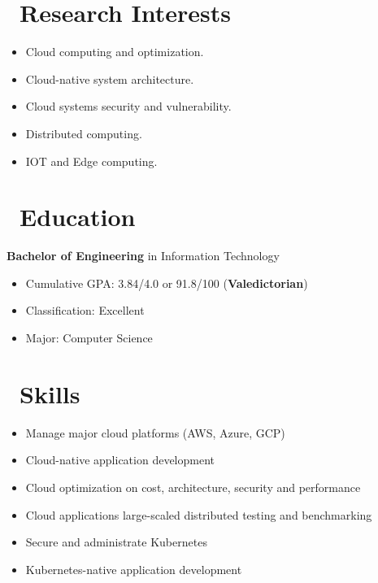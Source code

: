 \documentclass{resume}
\begin{document}




\section{\faBullseye\ Research Interests}
\begin{itemize}[parsep=0.5ex]
  \item Cloud computing and optimization.
  \item Cloud-native system architecture.
  \item Cloud systems security and vulnerability.
  \item Distributed computing.
  \item IOT and Edge computing.
\end{itemize}

\section{\faGraduationCap\ Education}
\textbf{Bachelor of Engineering} in Information Technology
\begin{itemize}[parsep=0.5ex]
  \item Cumulative GPA: 3.84/4.0 or 91.8/100 (\textbf{Valedictorian})
  \item Classification: Excellent
  \item Major: Computer Science
\end{itemize}


\section{\faCogs\ Skills}
\begin{itemize}[parsep=0.5ex]
  \item Manage major cloud platforms (AWS, Azure, GCP)
  \item Cloud-native application development
  \item Cloud optimization on cost, architecture, security and performance
  \item Cloud applications large-scaled distributed testing and benchmarking
  \item Secure and administrate Kubernetes
  \item Kubernetes-native application development
\end{itemize}
\end{document}
